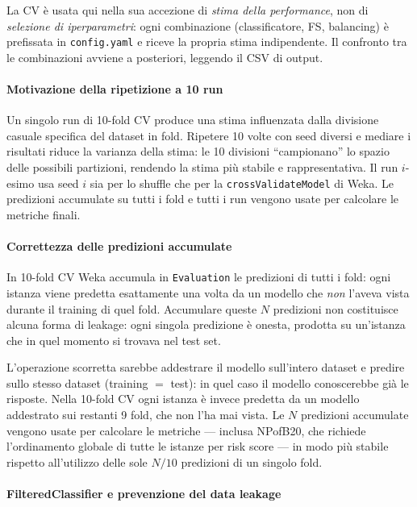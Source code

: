 La CV è usata qui nella sua accezione di \textit{stima della performance}, non di
\textit{selezione di iperparametri}: ogni combinazione (classificatore, FS, balancing) è
prefissata in \texttt{config.yaml} e riceve la propria stima indipendente. Il confronto
tra le combinazioni avviene a posteriori, leggendo il CSV di output.

\paragraph{Motivazione della ripetizione a 10 run}

Un singolo run di 10-fold CV produce una stima influenzata dalla divisione casuale
specifica del dataset in fold. Ripetere 10 volte con seed diversi e mediare i risultati
riduce la varianza della stima: le 10 divisioni ``campionano'' lo spazio delle possibili
partizioni, rendendo la stima più stabile e rappresentativa. Il run $i$-esimo usa seed
$i$ sia per lo shuffle che per la \texttt{crossValidateModel} di Weka. Le predizioni
accumulate su tutti i fold e tutti i run vengono usate per calcolare le metriche finali.

\paragraph{Correttezza delle predizioni accumulate}

In 10-fold CV Weka accumula in \texttt{Evaluation} le predizioni di tutti i fold: ogni
istanza viene predetta esattamente una volta da un modello che \emph{non} l'aveva vista
durante il training di quel fold. Accumulare queste $N$ predizioni non costituisce
alcuna forma di leakage: ogni singola predizione è onesta, prodotta su un'istanza che in
quel momento si trovava nel test set.

L'operazione scorretta sarebbe addestrare il modello sull'intero dataset e predire sullo
stesso dataset (training $=$ test): in quel caso il modello conoscerebbe già le risposte.
Nella 10-fold CV ogni istanza è invece predetta da un modello addestrato sui restanti 9
fold, che non l'ha mai vista. Le $N$ predizioni accumulate vengono usate per calcolare le
metriche --- inclusa NPofB20, che richiede l'ordinamento globale di tutte le istanze per
risk score --- in modo più stabile rispetto all'utilizzo delle sole $N/10$ predizioni di
un singolo fold.

\paragraph{FilteredClassifier e prevenzione del data leakage}

